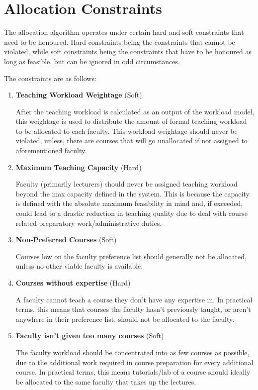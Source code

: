 \section{Allocation Constraints}

The allocation algorithm operates under certain hard and soft constraints that need to be honoured. Hard constraints being the constraints that cannot be violated, while soft constraints being the constraints that have to be honoured as long as feasible, but can be ignored in odd circumstances.

The constraints are as follows:
\begin{enumerate}
    \item \textbf{Teaching Workload Weightage} (Soft)

          After the teaching workload is calculated as an output of the workload model, this weightage is used to distribute the amount of formal teaching workload to be allocated to each faculty. This workload weightage should never be violated, unless, there are courses that will go unallocated if not assigned to aforementioned faculty.

    \item \textbf{Maximum Teaching Capacity} (Hard)

          Faculty (primarily lecturers) should never be assigned teaching workload beyond the max capacity defined in the system. This is because the capacity is defined with the absolute maximum feasibility in mind and, if exceeded, could lead to a drastic reduction in teaching quality due to deal with course related preparatory work/administrative duties.

    \item \textbf{Non-Preferred Courses} (Soft)

          Courses low on the faculty preference list should generally not be allocated, unless no other viable faculty is available.

    \item \textbf{Courses without expertise} (Hard)

          A faculty cannot teach a course they don't have any expertise in. In practical terms, this means that courses the faculty hasn't previously taught, or aren't anywhere in their preference list, should not be allocated to the faculty.

    \item \textbf{Faculty isn't given too many courses} (Soft)

          The faculty workload should be concentrated into as few courses as possible, due to the additional work required in course preparation for every additional course. In practical terms, this means tutorials/lab of a course should ideally be allocated to the same faculty that takes up the lectures.


\end{enumerate}

